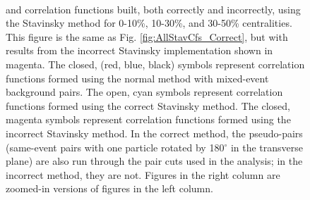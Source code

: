 \documentclass[../AnalysisNoteJBuxton.tex]{subfiles}
\begin{document}
\begin{figure}[h!]
  \\         
    
  \caption[\LamK Stavinsky Correlation Functions (Correct and Incorrect)]{\LamK and \ALamAK correlation functions built, both correctly and incorrectly, using the Stavinsky method for 0-10\%, 10-30\%, and 30-50\% centralities.  This figure is the same as Fig. \ref{fig:AllStavCfs_Correct}, but with results from the incorrect Stavinsky implementation shown in magenta.  The closed, (red, blue, black) symbols represent correlation functions formed using the normal method with mixed-event background pairs.  The open, cyan symbols represent correlation functions formed using the correct Stavinsky method.  The closed, magenta symbols represent correlation functions formed using the incorrect Stavinsky method.  In the correct method, the pseudo-pairs (same-event pairs with one particle rotated by 180$^\circ$ in the transverse plane) are also run through the pair cuts used in the analysis; in the incorrect method, they are not.  Figures in the right column are zoomed-in versions of figures in the left column.}
  \label{fig:AllStavCfs_CorrectAndIncorrect}
\end{figure}
\end{document}
